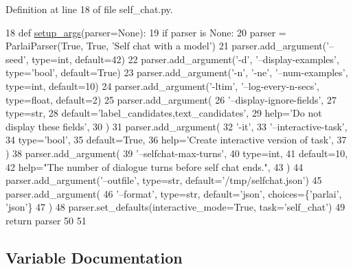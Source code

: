 Definition at line 18 of file self\+\_\+chat.\+py.


\begin{DoxyCode}
18 \textcolor{keyword}{def }\hyperlink{namespaceparlai_1_1scripts_1_1self__chat_a0899a6bf4e3d48c81a2c1b97f9696714}{setup\_args}(parser=None):
19     \textcolor{keywordflow}{if} parser \textcolor{keywordflow}{is} \textcolor{keywordtype}{None}:
20         parser = ParlaiParser(\textcolor{keyword}{True}, \textcolor{keyword}{True}, \textcolor{stringliteral}{'Self chat with a model'})
21     parser.add\_argument(\textcolor{stringliteral}{'--seed'}, type=int, default=42)
22     parser.add\_argument(\textcolor{stringliteral}{'-d'}, \textcolor{stringliteral}{'--display-examples'}, type=\textcolor{stringliteral}{'bool'}, default=\textcolor{keyword}{True})
23     parser.add\_argument(\textcolor{stringliteral}{'-n'}, \textcolor{stringliteral}{'-ne'}, \textcolor{stringliteral}{'--num-examples'}, type=int, default=10)
24     parser.add\_argument(\textcolor{stringliteral}{'-ltim'}, \textcolor{stringliteral}{'--log-every-n-secs'}, type=float, default=2)
25     parser.add\_argument(
26         \textcolor{stringliteral}{'--display-ignore-fields'},
27         type=str,
28         default=\textcolor{stringliteral}{'label\_candidates,text\_candidates'},
29         help=\textcolor{stringliteral}{'Do not display these fields'},
30     )
31     parser.add\_argument(
32         \textcolor{stringliteral}{'-it'},
33         \textcolor{stringliteral}{'--interactive-task'},
34         type=\textcolor{stringliteral}{'bool'},
35         default=\textcolor{keyword}{True},
36         help=\textcolor{stringliteral}{'Create interactive version of task'},
37     )
38     parser.add\_argument(
39         \textcolor{stringliteral}{'--selfchat-max-turns'},
40         type=int,
41         default=10,
42         help=\textcolor{stringliteral}{"The number of dialogue turns before self chat ends."},
43     )
44     parser.add\_argument(\textcolor{stringliteral}{'--outfile'}, type=str, default=\textcolor{stringliteral}{'/tmp/selfchat.json'})
45     parser.add\_argument(
46         \textcolor{stringliteral}{'--format'}, type=str, default=\textcolor{stringliteral}{'json'}, choices=\{\textcolor{stringliteral}{'parlai'}, \textcolor{stringliteral}{'json'}\}
47     )
48     parser.set\_defaults(interactive\_mode=\textcolor{keyword}{True}, task=\textcolor{stringliteral}{'self\_chat'})
49     \textcolor{keywordflow}{return} parser
50 
51 
\end{DoxyCode}


\subsection{Variable Documentation}
\mbox{\label{namespaceparlai_1_1scripts_1_1self__chat_aa318de0dcf8e4474b9cc89fb2ed28a80}} 
